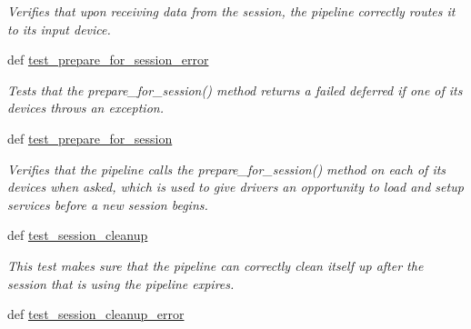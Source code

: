 \begin{DoxyCompactItemize}
\begin{DoxyCompactList}\small\item\em Verifies that upon receiving data from the session, the pipeline correctly routes it to its input device. \end{DoxyCompactList}\item 
\hypertarget{classhwm_1_1hardware_1_1pipelines_1_1tests_1_1test__pipeline_1_1_test_pipeline_ab7ca9c008a91170d9ffa387a52b563a6}{def \hyperlink{classhwm_1_1hardware_1_1pipelines_1_1tests_1_1test__pipeline_1_1_test_pipeline_ab7ca9c008a91170d9ffa387a52b563a6}{test\-\_\-prepare\-\_\-for\-\_\-session\-\_\-error}}\label{classhwm_1_1hardware_1_1pipelines_1_1tests_1_1test__pipeline_1_1_test_pipeline_ab7ca9c008a91170d9ffa387a52b563a6}

\begin{DoxyCompactList}\small\item\em Tests that the prepare\-\_\-for\-\_\-session() method returns a failed deferred if one of its devices throws an exception. \end{DoxyCompactList}\item 
\hypertarget{classhwm_1_1hardware_1_1pipelines_1_1tests_1_1test__pipeline_1_1_test_pipeline_a1db39ac8a000451ed58a7c90a3abc4a5}{def \hyperlink{classhwm_1_1hardware_1_1pipelines_1_1tests_1_1test__pipeline_1_1_test_pipeline_a1db39ac8a000451ed58a7c90a3abc4a5}{test\-\_\-prepare\-\_\-for\-\_\-session}}\label{classhwm_1_1hardware_1_1pipelines_1_1tests_1_1test__pipeline_1_1_test_pipeline_a1db39ac8a000451ed58a7c90a3abc4a5}

\begin{DoxyCompactList}\small\item\em Verifies that the pipeline calls the prepare\-\_\-for\-\_\-session() method on each of its devices when asked, which is used to give drivers an opportunity to load and setup services before a new session begins. \end{DoxyCompactList}\item 
\hypertarget{classhwm_1_1hardware_1_1pipelines_1_1tests_1_1test__pipeline_1_1_test_pipeline_a05d10d8d854d7af6e0fed191e6efdbb0}{def \hyperlink{classhwm_1_1hardware_1_1pipelines_1_1tests_1_1test__pipeline_1_1_test_pipeline_a05d10d8d854d7af6e0fed191e6efdbb0}{test\-\_\-session\-\_\-cleanup}}\label{classhwm_1_1hardware_1_1pipelines_1_1tests_1_1test__pipeline_1_1_test_pipeline_a05d10d8d854d7af6e0fed191e6efdbb0}

\begin{DoxyCompactList}\small\item\em This test makes sure that the pipeline can correctly clean itself up after the session that is using the pipeline expires. \end{DoxyCompactList}\item 
\hypertarget{classhwm_1_1hardware_1_1pipelines_1_1tests_1_1test__pipeline_1_1_test_pipeline_aa98c4e9c56b533cbd5f37d1f46c5f505}{def \hyperlink{classhwm_1_1hardware_1_1pipelines_1_1tests_1_1test__pipeline_1_1_test_pipeline_aa98c4e9c56b533cbd5f37d1f46c5f505}{test\-\_\-session\-\_\-cleanup\-\_\-error}}\label{classhwm_1_1hardware_1_1pipelines_1_1tests_1_1test__pipeline_1_1_test_pipeline_aa98c4e9c56b533cbd5f37d1f46c5f505}


\end{DoxyCompactItemize}
